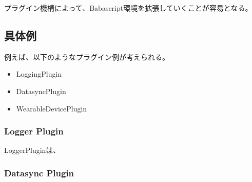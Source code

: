 プラグイン機構によって、Babascript環境を拡張していくことが容易となる。

\subsection{具体例}\label{ux5177ux4f53ux4f8b}

例えば、以下のようなプラグイン例が考えられる。

\begin{itemize}
\itemsep1pt\parskip0pt
\item
  LoggingPlugin
\item
  DatasyncPlugin
\item
  WearableDevicePlugin
\end{itemize}

\subsubsection{Logger Plugin}\label{logger-plugin}

LoggerPluginは、

\subsubsection{Datasync Plugin}\label{datasync-plugin}
